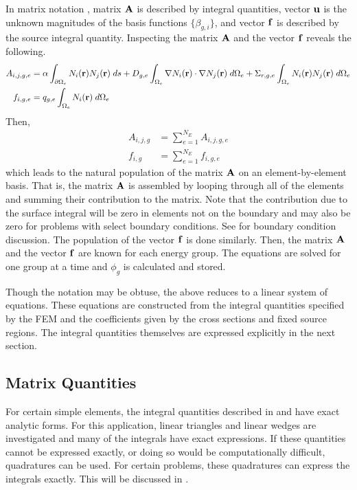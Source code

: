     In matrix notation , matrix $\mathbf{A}$ is 
    described by integral quantities, vector $\mathbf{u}$ is the unknown magnitudes of
    the basis functions $\{\beta_{g,i}\}$, and vector $\mathbf{f}$ is described by the 
    source integral quantity. Inspecting the matrix $\mathbf{A}$ and the vector $\mathbf{f}$
    reveals the following.
    \begin{align}
      \label{eq:matrix_population}
      A_{i,j,g,e} &= \alpha \int_{\partial \Omega_e} N_i(\mathbf{r}) 
        N_j(\mathbf{r}) \; ds + D_{g,e} 
        \int_{\Omega_e} \mathbf{\nabla} N_i(\mathbf{r}) \cdot \mathbf{\nabla} N_j(\mathbf{r}) \;
        d\Omega_e + \Sigma_{r,g,e} \int_{\Omega_e} N_i(\mathbf{r}) N_j(\mathbf{r})
        \; d\Omega_e \\
      \label{eq:vector_population}
      f_{i,g,e} &= q_{g,e} \int_{\Omega_e} N_i(\mathbf{r}) \;d\Omega_e
    \end{align}
    Then, 
    \begin{align}
      A_{i,j,g} &= \sum_{e=1}^{N_E} A_{i,j,g,e} \\
      f_{i,g} &=  \sum_{e=1}^{N_E} f_{i,g,e}
    \end{align}
    which leads to the natural population of the matrix $\mathbf{A}$ on an 
    element-by-element basis. That is, the matrix $\mathbf{A}$ is assembled by looping
    through all of the elements and summing their contribution to the matrix. 
    Note that the contribution due to the surface integral will be zero in 
    elements not on the boundary and may also be zero for problems with select
    boundary conditions. See  for boundary
    condition discussion.  The population of the vector $\mathbf{f}$ is done similarly. 
    Then, the matrix $\mathbf{A}$ and the vector $\mathbf{f}$ are known for each energy group.
    The equations are solved for one group at a time and $\phi_g$ is calculated
    and stored.
    
    Though the notation may be obtuse, the above reduces to a linear system of
    equations. These equations are constructed from the integral quantities 
    specified by the FEM and the coefficients given by the cross sections and
    fixed source regions. The integral quantities themselves are expressed 
    explicitly in the next section.
    
  \subsection{Matrix Quantities}
    \label{sec:matrix_quantities}
    For certain simple elements, the integral quantities described in 
     and  have exact 
    analytic forms. For this application, linear triangles and linear wedges
    are investigated and many of the integrals have exact expressions. If these 
    quantities cannot be expressed exactly, or doing so would be computationally
    difficult, quadratures can be used. For certain problems, these 
    quadratures can express the integrals exactly. This will be discussed in 
    .
